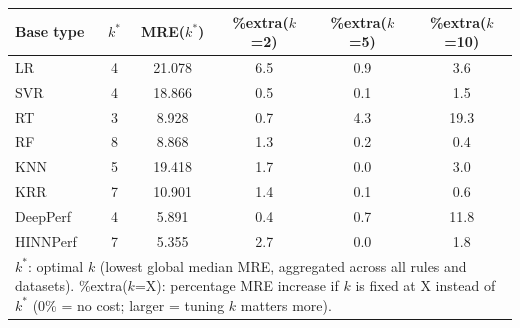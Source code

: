 \begin{tabular}{lccccc}
\toprule
Base type & $k^*$ & MRE($k^*$) & \%extra($k$=2) & \%extra($k$=5) & \%extra($k$=10) \\
\midrule
LR & 4 & 21.078 & 6.5 & 0.9 & 3.6 \\
SVR & 4 & 18.866 & 0.5 & 0.1 & 1.5 \\
RT & 3 & 8.928 & 0.7 & 4.3 & 19.3 \\
RF & 8 & 8.868 & 1.3 & 0.2 & 0.4 \\
KNN & 5 & 19.418 & 1.7 & 0.0 & 3.0 \\
KRR & 7 & 10.901 & 1.4 & 0.1 & 0.6 \\
DeepPerf & 4 & 5.891 & 0.4 & 0.7 & 11.8 \\
HINNPerf & 7 & 5.355 & 2.7 & 0.0 & 1.8 \\
\bottomrule
\multicolumn{6}{l}{\footnotesize $k^*$: optimal $k$ (lowest global median MRE, aggregated across all rules and datasets). \%extra($k$=X): percentage MRE increase if $k$ is fixed at X instead of $k^*$ (0\% = no cost; larger = tuning $k$ matters more).} \\
\end{tabular}
